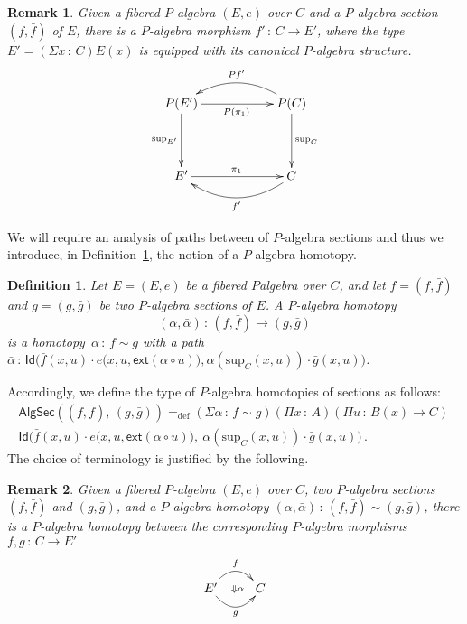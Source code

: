 \documentclass[10pt,a4paper,oneside,reqno]{amsart}
\numberwithin{equation}{section}
\theoremstyle{mythm}
\theoremstyle{mydef}
\newtheorem{definition}[theorem]{Definition}
\theoremstyle{myrmk}
\newtheorem*{remark*}{Remark}
\newcommand{\defeq}{=_{\mathrm{def}}}
\newcommand{\co}{\,{:}\,}
\newcommand{\ct}{\cdot}
\newcommand{\ext}{\mathsf{ext}}
\newcommand{\Id}{\mathsf{Id}}
\renewcommand{\sup}{\mathrm{sup}}
\newcommand{\AlgSecHot}{\mathsf{AlgSec}}
\begin{document}
\begin{remark*}
Given a fibered $P$-algebra $(E, e)$ over $C$ and a $P$-algebra section $(f, \bar{f})$ of $E$, there is a $P$-algebra 
morphism $f' \co C \to E'$, where the type $E' = (\Sigma x \co C) E(x)$ is equipped with its canonical 
$P$-algebra structure. 
\[
\xymatrix@C=2cm@R=1.5cm{
P(E')  \ar[d]_-{\sup_{E'}}   \ar[r]_{P(\pi_1)}   & P(C)  \ar[d]^-{\sup_C}   \ar@/_1.4pc/[l]_{Pf'}  \\ 
E'  \ar[r]^{\pi_1}    & C \ar@/^1.4pc/[l]^{f'} }
 \]
\end{remark*}



We will require an analysis of paths between of $P$-algebra sections and thus we introduce, in Definition~\ref{def:W2cellsection}, the
notion of a $P$-algebra homotopy.

\begin{definition} \label{def:W2cellsection} Let $E = (E, e)$ be a fibered $P$algebra over $C$, and let $f = (f, \bar{f})$ and $g = (g, \bar{g})$ be two $P$-algebra sections of $E$.  A \emph{$P$-algebra homotopy} 
\[
(\alpha , \bar{\alpha}) \co (f, \bar{f})  \rightarrow (g, \bar{g})
\] 
is a homotopy~$\alpha \co f \sim g$ with a path
$\bar{\alpha} \co 
\Id\big( \bar{f}(x,u)  \ct e\big(x,u, \ext (\alpha \circ u) \big),
\alpha(\sup_C(x,u)) \ct \bar{g}(x,u) \big)$. 
\end{definition} 

Accordingly, we define the type of $P$-algebra homotopies of sections as follows:
\begin{multline*}
\AlgSecHot( (f, \bar{f}) ,\, (g, \bar{g}) )  \defeq 
(\Sigma \alpha \co f \sim g) 
(\Pi x \co A) 
(\Pi u \co B(x) \to C) \, \\ 
\Id\big( \bar{f}(x,u)  \ct e \big(x,u, \ext (\alpha \circ u) \big),\ 
\alpha(\sup_C(x,u)) \ct \bar{g}(x,u) \big) \, .
\end{multline*}
The choice of terminology is justified by the following.

\begin{remark*} 
Given a fibered $P$-algebra $(E, e)$ over $C$, two $P$-algebra sections $(f, \bar{f})$ and $(g, \bar{g})$, and a 
$P$-algebra homotopy $(\alpha, \bar{\alpha}) \co (f, \bar{f}) \sim (g, \bar{g})$, there is a $P$-algebra homotopy between the corresponding $P$-algebra morphisms $f, g \co C \to E'$ 
\[
\xymatrix{ E' \ar@{}[r]|{\ \Downarrow \alpha}   \ar@/^1.2pc/[r]^{f}  \ar@/_1.2pc/[r]_{g} & C}
 \]
\end{remark*}
\end{document}
